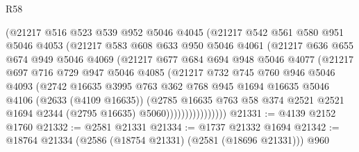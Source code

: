 \begin{lexlean}{R58}
\begin{coremodule}
                  (@21217
                    @516
                    @523
                    @539
                    @952
                    @5046
                    @4045
                    (@21217
                      @542
                      @561
                      @580
                      @951
                      @5046
                      @4053
                      (@21217
                        @583
                        @608
                        @633
                        @950
                        @5046
                        @4061
                        (@21217
                          @636
                          @655
                          @674
                          @949
                          @5046
                          @4069
                          (@21217
                            @677
                            @684
                            @694
                            @948
                            @5046
                            @4077
                            (@21217
                              @697
                              @716
                              @729
                              @947
                              @5046
                              @4085
                              (@21217
                                @732
                                @745
                                @760
                                @946
                                @5046
                                @4093
                                (@2742
                                  @16635
                                  @3995
                                  @763
                                  @362
                                  @768
                                  @945
                                  @1694
                                  @16635
                                  @5046
                                  @4106
                                  (@2633 (@4109 @16635))
                                  (@2785
                                    @16635
                                    @763
                                    @58
                                    @374
                                    @2521
                                    @2521
                                    @1694
                                    @2344
                                    (@2795 @16635)
                                    @5060))))))))))))))))
@21331 := @4139 @2152 @1760
@21332 := @2581 @21331
@21334 := @1737 @21332 @1694
@21342 := @18764 @21334 (@2586 (@18754 @21331) (@2581 (@18696 @21331))) @960

\end{coremodule}
\end{lexlean}
